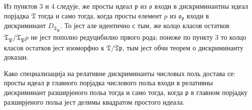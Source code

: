 \documentclass[11pt]{article}
\newcommand{\mo}{\mathfrak{o}}
\newcommand{\mT}{\mathfrak{T}}
\newcommand{\mP}{\mathfrak{P}}
\newcommand{\mpideal}{\mathfrak{p}}
\begin{document}
\setcounter{footnote}{39}

\noindent Из пунктов 3 и 4 следује, же просты идеал $\mpideal$ из $\mo$ входи в дискриминантны идеал порјадка $\mT$ тогда и само тогда, когда просты елемент $p$ из $\mo_\mpideal$ входи в дискриминант $D_{\mT_\mP}$. То јест але идентично с тым, же колцо класов остатков $\mT_\mP/\mT_\mP p$ не јест пополно редуцибилно првого рода; понеже по пункту 3 то колцо класов остатков јест изоморфно к $\mT/\mT\mpideal$, тым јест обчи теорем о дискриминанту доказан.

\noindent Како специализација на релативне дискриминанты числовых поль достава се: просты идеал $\mpideal$ главного порјадка числового польа входи в релативны дискриминант разширјеного польа тогда и само тогда, когда $\mpideal$ в главном порјадку разширјеного польа јест делимы квадратом простого идеала.
\end{document}
